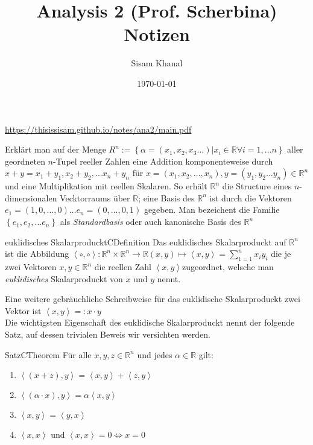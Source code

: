 \documentclass[a4paper]{memoir}
\title{Analysis 2 (Prof. Scherbina) Notizen}
\author{Sisam Khanal}
\date{\today}
\begin{document}
\pagecolor{White}
\color{Black}
\maketitle
\vfill
\vspace{0.3cm} 
\centerline{\href{https://thisissisam.github.io/notes/ana2/main.pdf}{https://thisissisam.github.io/notes/ana2/main.pdf}}
\thispagestyle{empty}


Erklärt man auf der Menge $ R^{n} := \left\{ \alpha = \left( x_1,x_2,x_3 \dots  \right) | x_{i} \in \mathbb{R} \forall i = 1, \dots n \right\}  $ 
aller geordneten $ n $-Tupel reeller Zahlen eine Addition komponenteweise 
durch  $ x+y = x_1+y_1, x_2+y_2, \dots x_{n} + y_{n}$  für 
$ x = \left( x_1,x_2, \dots, x_{n} \right), y = \left( y_1,y_2\dots y_{n} \right)
\in \mathbb{R}^{n} $ und eine Multiplikation mit reellen Skalaren. So erhält
$ \mathbb{R}^{n} $ die Structure eines $ n $-dimensionalen Vecktorraums über
$ \mathbb{R} $; eine Basis des $ \mathbb{R}^{n} $ ist durch die Vektoren
$ e_1 = \left( 1, 0, \dots , 0 \right) \dots e_{n} = \left( 0, \dots, 0, 1\right)
$ gegeben. Man bezeichent die Familie $ \left\{ e_1, e_2, \dots e_{n} \right\} $
als \textit{Standardbasis} oder auch kanonische Basis des $ \mathbb{R}^{n} $ 
   
\begin{ibox}{euklidisches Skalarproduckt}{CDefinition}
    Das euklidisches Skalarproduckt auf $ \mathbb{R}^{n} $ ist die Abbildung
    $ \left< \circ , \circ \right> : \mathbb{R}^{n} \times \mathbb{R}^{n}
    \to \mathbb{R} \left( x, y \right) \mapsto \left<x, y \right> = 
    \sum_{1=1}^n x_{i}y_{i}$ die je zwei Vektoren $ x, y \in \mathbb{R}^{n} $
    die reellen Zahl $ \left<x,y \right> $zugeordnet, welsche man 
    \textit{euklidisches} Skalarproduckt  von $ x \text{ und } y $ nennt. 
\end{ibox}

Eine weitere gebräuchliche Schreibweise für das euklidische Skalarproduckt zwei
Vektor ist $ \left<x,y \right> =: x \cdot y $ \\
Die wichtigsten Eigenschaft des euklidische Skalarproduckt nennt der folgende
Satz, auf dessen trivialen Beweis wir versichten werden.

\begin{ibox}{Satz}{CTheorem}
    Für alle $ x, y, z \in \mathbb{R}^{n} $ und jedes $ \alpha \in  \mathbb{R} $ gilt:
    \begin{enumerate}[label=\alph*)]
        \item $ \left< \left( x + z \right) , y \right> = \left< x,y \right>
            + \left<z, y \right>$ 
        \item $ \left< \left( \alpha \cdot x \right), y \right> = \alpha
            \left< x, y \right>$ 
        \item $ \left< x, y \right> = \left< y,x \right> $ 
        \item $ \left<x,x \right>  $ und $ \left<x,x \right> = 0 \iff x = 0 $
    \end{enumerate}
\end{ibox}
\end{document}
